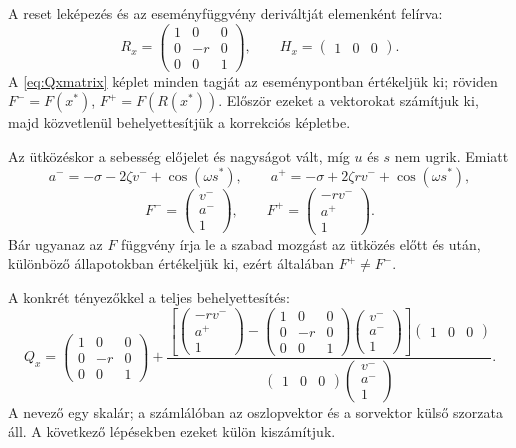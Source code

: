 A reset leképezés és az eseményfüggvény deriváltját elemenként felírva:
\[
R_x=\begin{pmatrix}1&0&0\\0&-r&0\\0&0&1\end{pmatrix},\qquad
H_x=\begin{pmatrix}1&0&0\end{pmatrix}.
\]
A \eqref{eq:Qxmatrix} képlet minden tagját az eseménypontban értékeljük ki; röviden $F^-=F(x^*)$, $F^+=F(R(x^*))$. Először ezeket a vektorokat számítjuk ki, majd közvetlenül behelyettesítjük a korrekciós képletbe.


Az ütközéskor a sebesség előjelet és nagyságot vált, míg $u$ és $s$ nem ugrik. Emiatt
\[
a^-=-\sigma-2\zeta v^-+\cos(\omega s^*),\qquad
 a^+=-\sigma+2\zeta r v^-+\cos(\omega s^*),
\]
\[
F^-=\begin{pmatrix}v^-\\a^-\\1\end{pmatrix},\qquad
F^+=\begin{pmatrix}-rv^-\\a^+\\1\end{pmatrix}.
\]
Bár ugyanaz az $F$ függvény írja le a szabad mozgást az ütközés előtt és után, különböző állapotokban értékeljük ki, ezért általában $F^+\neq F^-$.

A konkrét tényezőkkel a teljes behelyettesítés:
\[
Q_x=
\begin{pmatrix}1&0&0\\0&-r&0\\0&0&1\end{pmatrix}
+\frac{
\left[
\begin{pmatrix}-rv^-\\a^+\\1\end{pmatrix}
-\begin{pmatrix}1&0&0\\0&-r&0\\0&0&1\end{pmatrix}
\begin{pmatrix}v^-\\a^-\\1\end{pmatrix}
\right]\begin{pmatrix}1&0&0\end{pmatrix}}
{\begin{pmatrix}1&0&0\end{pmatrix}\begin{pmatrix}v^-\\a^-\\1\end{pmatrix}}.
\]
A nevező egy skalár; a számlálóban az oszlopvektor és a sorvektor külső szorzata áll. A következő lépésekben ezeket külön kiszámítjuk.


